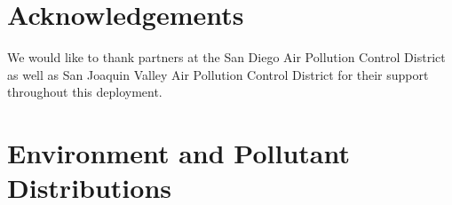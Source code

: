 \documentclass[journal abbreviation, manuscript]{copernicus}
\begin{document}

\section{Acknowledgements}

We would like to thank partners at the San Diego Air Pollution Control District as well as San Joaquin Valley Air Pollution Control District for their support throughout this deployment. 

\clearpage
\appendix
\setcounter{table}{0}

\section{Environment and Pollutant Distributions}\label{Distributions}
\end{document}
